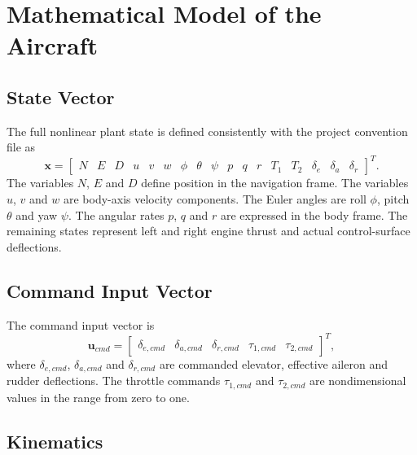 \chapter{Mathematical Model of the Aircraft}

\section{State Vector}

The full nonlinear plant state is defined consistently with the project convention file as
\begin{equation}
    \bm{x} =
    \begin{bmatrix}
        N & E & D & u & v & w & \phi & \theta & \psi &
        p & q & r & T_1 & T_2 & \delta_e & \delta_a & \delta_r
    \end{bmatrix}^{T}.
\end{equation}
The variables $N$, $E$ and $D$ define position in the navigation frame. The variables $u$, $v$ and $w$ are body-axis velocity components. The Euler angles are roll $\phi$, pitch $\theta$ and yaw $\psi$. The angular rates $p$, $q$ and $r$ are expressed in the body frame. The remaining states represent left and right engine thrust and actual control-surface deflections.

\section{Command Input Vector}

The command input vector is
\begin{equation}
    \bm{u}_{cmd} =
    \begin{bmatrix}
        \delta_{e,cmd} &
        \delta_{a,cmd} &
        \delta_{r,cmd} &
        \tau_{1,cmd} &
        \tau_{2,cmd}
    \end{bmatrix}^{T},
\end{equation}
where $\delta_{e,cmd}$, $\delta_{a,cmd}$ and $\delta_{r,cmd}$ are commanded elevator, effective aileron and rudder deflections. The throttle commands $\tau_{1,cmd}$ and $\tau_{2,cmd}$ are nondimensional values in the range from zero to one.

\section{Kinematics}

